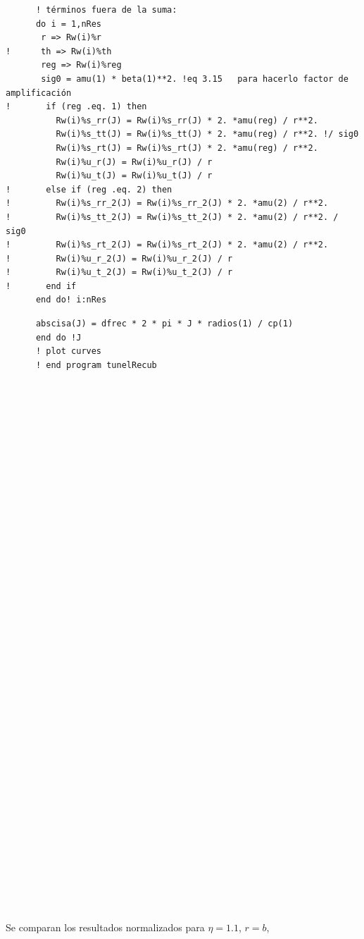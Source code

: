 \documentclass [11pt,spanish]{article}
\begin{document}
\begin{shaded}
\begin{verbatim}
      ! términos fuera de la suma:
      do i = 1,nRes
       r => Rw(i)%r
!      th => Rw(i)%th
       reg => Rw(i)%reg
       sig0 = amu(1) * beta(1)**2. !eq 3.15   para hacerlo factor de amplificación
!       if (reg .eq. 1) then
          Rw(i)%s_rr(J) = Rw(i)%s_rr(J) * 2. *amu(reg) / r**2. 
          Rw(i)%s_tt(J) = Rw(i)%s_tt(J) * 2. *amu(reg) / r**2. !/ sig0
          Rw(i)%s_rt(J) = Rw(i)%s_rt(J) * 2. *amu(reg) / r**2. 
          Rw(i)%u_r(J) = Rw(i)%u_r(J) / r 
          Rw(i)%u_t(J) = Rw(i)%u_t(J) / r 
!       else if (reg .eq. 2) then
!         Rw(i)%s_rr_2(J) = Rw(i)%s_rr_2(J) * 2. *amu(2) / r**2. 
!         Rw(i)%s_tt_2(J) = Rw(i)%s_tt_2(J) * 2. *amu(2) / r**2. / sig0
!         Rw(i)%s_rt_2(J) = Rw(i)%s_rt_2(J) * 2. *amu(2) / r**2. 
!         Rw(i)%u_r_2(J) = Rw(i)%u_r_2(J) / r 
!         Rw(i)%u_t_2(J) = Rw(i)%u_t_2(J) / r 
!       end if
      end do! i:nRes

\end{verbatim}
\end{shaded}
\endgroup

\begingroup
\fontsize{10pt}{12pt}
\selectfont
{}
\begin{shaded}
\begin{verbatim}
      abscisa(J) = dfrec * 2 * pi * J * radios(1) / cp(1)
      end do !J   
      ! plot curves
      ! end program tunelRecub
      
      
      
      
      
      
      
      
      
      
      
      
      
      
      
      
      
      
      
      
      
      
      
      
      
      
      
      
      
      
      
      
      
      
      
      
      
      
      
\end{verbatim}
\end{shaded}
\endgroup
Se comparan los resultados normalizados para $\eta=1.1$, $r=b$,
\end{document}
